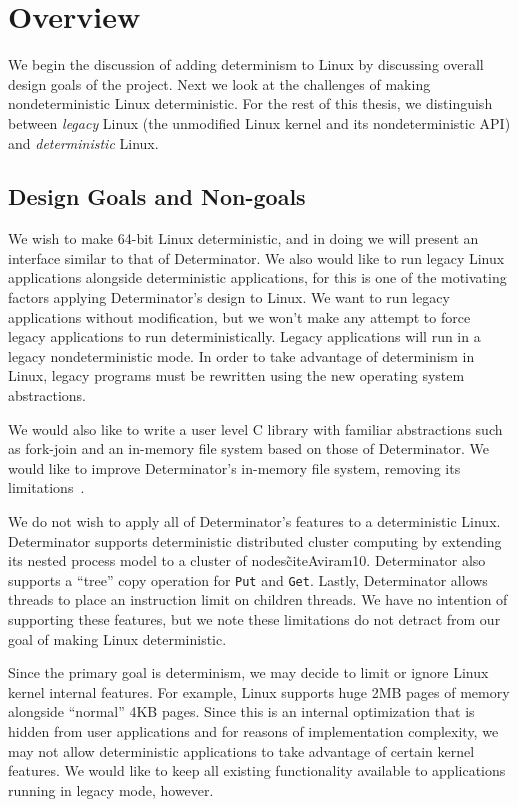 \section{Overview}

We begin the discussion of adding determinism to Linux by discussing overall
design goals of the project. Next we look at the challenges of making
nondeterministic Linux deterministic. For the rest of this thesis, we
distinguish between \emph{legacy} Linux (the unmodified Linux kernel and its
nondeterministic API) and \emph{deterministic} Linux.

\subsection{Design Goals and Non-goals}

We wish to make 64-bit Linux deterministic, and in doing we will present an
interface similar to that of Determinator. We also would like to run legacy
Linux applications alongside deterministic applications, for this is one of the
motivating factors applying Determinator's design to Linux. We want to run
legacy applications without modification, but we won't make any attempt to force
legacy applications to run deterministically. Legacy applications will run in a
legacy nondeterministic mode. In order to take advantage of determinism in
Linux, legacy programs must be rewritten using the new operating system
abstractions.

We would also like to write a user level C library with familiar abstractions
such as fork-join and an in-memory file system based on those of Determinator.
We would like to improve Determinator's in-memory file system, removing its
limitations~\cite{Aviram10,Aviram10cloud}.

We do not wish to apply all of Determinator's features to a deterministic Linux.
Determinator supports deterministic distributed cluster computing by extending
its nested process model to a cluster of nodes\~cite{Aviram10}. Determinator
also supports a ``tree'' copy operation for {\tt Put} and {\tt Get}. Lastly,
Determinator allows threads to place an instruction limit on children threads.
We have no intention of supporting these features, but we note these limitations
do not detract from our goal of making Linux deterministic.

Since the primary goal is determinism, we may decide to limit or ignore Linux
kernel internal features. For example, Linux supports huge 2MB pages of memory
alongside ``normal'' 4KB pages. Since this is an internal optimization that is
hidden from user applications and for reasons of
implementation complexity, we may not allow deterministic applications to take
advantage of certain kernel features. We would like to keep all existing
functionality available to applications running in legacy mode, however.

